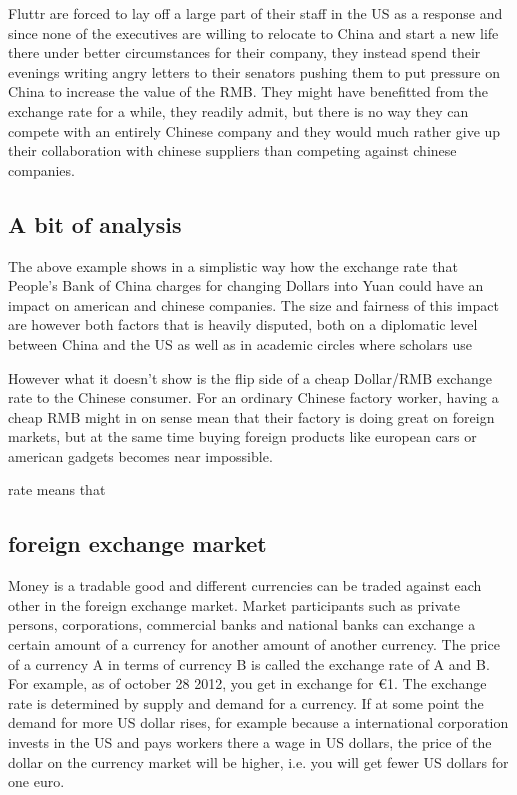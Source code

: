 \documentclass[11pt]{article}
\begin{document}
Fluttr are forced to lay off a large part of their staff in the US as a 
response and since none of the executives are willing to relocate to 
China and start a new life there under better circumstances for their 
company, they instead spend their evenings writing angry letters to 
their senators pushing them to put pressure on China to increase the 
value of the RMB. They might have benefitted from the exchange rate for 
a while, they readily admit, but there is no way they can compete with 
an entirely Chinese company and they would much rather give up their 
collaboration with chinese suppliers than competing against chinese 
companies.

\subsection{A bit of analysis}

The above example shows in a simplistic way how the exchange rate that 
People's Bank of China charges for changing Dollars into Yuan could have 
an impact on american and chinese companies. The size and fairness of 
this impact are however both factors that is heavily disputed, both on a 
diplomatic level between China and the US as well as in academic circles 
where scholars use

However what it doesn't show is the flip side of a cheap Dollar/RMB 
exchange rate to the Chinese consumer. For an ordinary Chinese factory 
worker, having a cheap RMB might in on sense mean that their factory is 
doing great on foreign markets, but at the same time buying foreign 
products like european cars or american gadgets becomes near impossible. 


rate means that 

\subsection{foreign exchange market}

Money is a tradable good and different currencies can be traded against 
each other in the foreign exchange market. Market participants such as 
private persons, corporations, commercial banks and national banks can 
exchange a certain amount of a currency for another amount of another 
currency. The price of a currency A in terms of currency B is called the 
exchange rate of A and B. For example, as of october 28 2012, you get 
 in exchange for \euro{1}. The exchange rate is 
determined by supply and demand for a currency. If at some point the 
demand for more US dollar rises, for example because a international 
corporation invests in the US and pays workers there a wage in US 
dollars, the price of the dollar on the currency market will be higher, 
i.e. you will get fewer US dollars for one euro.
\end{document}
